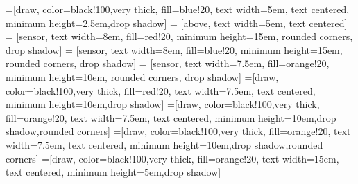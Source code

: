 \documentclass{article}
\begin{document}

=[draw, color=black!100,very thick, fill=blue!20, text width=5em, 
    text centered, minimum height=2.5em,drop shadow]
 = [above, text width=5em, text centered]
 = [sensor, text width=8em, fill=red!20, 
    minimum height=15em, rounded corners, drop shadow]
 = [sensor, text width=8em, fill=blue!20, 
    minimum height=15em, rounded corners, drop shadow]
 = [sensor, text width=7.5em, fill=orange!20, 
    minimum height=10em, rounded corners, drop shadow]
=[draw, color=black!100,very thick, fill=red!20, text width=7.5em, 
text centered, minimum height=10em,drop shadow]
=[draw, color=black!100,very thick, fill=orange!20, text width=7.5em, 
text centered, minimum height=10em,drop shadow,rounded corners]
=[draw, color=black!100,very thick, fill=orange!20, text width=7.5em, 
text centered, minimum height=10em,drop shadow,rounded corners]
=[draw, color=black!100,very thick, fill=orange!20, text width=15em, 
text centered, minimum height=5em,drop shadow]

\def\blockdist{2.3}
\def\edgedist{2.5}
\end{document}
